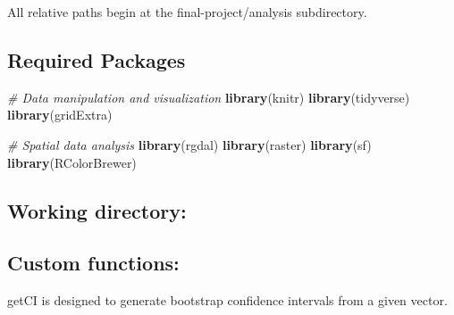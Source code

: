 \documentclass[]{article}
\newenvironment{Shaded}{\begin{snugshade}}{\end{snugshade}}
\newcommand{\CommentTok}[1]{\textcolor[rgb]{0.56,0.35,0.01}{\textit{#1}}}
\newcommand{\DataTypeTok}[1]{\textcolor[rgb]{0.13,0.29,0.53}{#1}}
\newcommand{\KeywordTok}[1]{\textcolor[rgb]{0.13,0.29,0.53}{\textbf{#1}}}
\newcommand{\NormalTok}[1]{#1}
\newcommand{\OperatorTok}[1]{\textcolor[rgb]{0.81,0.36,0.00}{\textbf{#1}}}
\newcommand{\OtherTok}[1]{\textcolor[rgb]{0.56,0.35,0.01}{#1}}
\begin{document}
All relative paths begin at the final-project/analysis subdirectory.

\hypertarget{required-packages}{%
\subsection{Required Packages}\label{required-packages}}

\begin{Shaded}
\end{Shaded}

\begin{Shaded}
\begin{Highlighting}[]
\CommentTok{# Data manipulation and visualization}
\KeywordTok{library}\NormalTok{(knitr)}
\KeywordTok{library}\NormalTok{(tidyverse)}
\KeywordTok{library}\NormalTok{(gridExtra)}

\CommentTok{# Spatial data analysis}
\KeywordTok{library}\NormalTok{(rgdal)}
\KeywordTok{library}\NormalTok{(raster)}
\KeywordTok{library}\NormalTok{(sf)}
\KeywordTok{library}\NormalTok{(RColorBrewer)}
\end{Highlighting}
\end{Shaded}

\hypertarget{working-directory}{%
\subsection{Working directory:}\label{working-directory}}

\hypertarget{custom-functions}{%
\subsection{Custom functions:}\label{custom-functions}}

getCI is designed to generate bootstrap confidence intervals from a
given vector.
\end{document}
